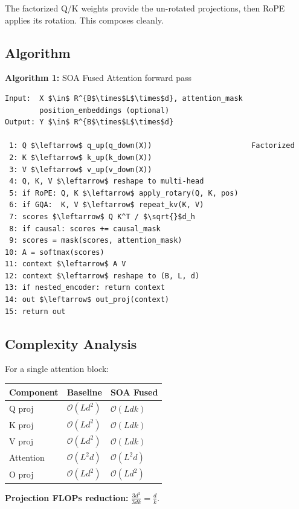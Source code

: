 The factorized Q/K weights provide the un-rotated projections, then RoPE 
applies its rotation. This composes cleanly.

\subsection{Algorithm}

\textbf{Algorithm 1:} SOA Fused Attention forward pass
\begin{lstlisting}
Input:  X $\in$ R^{B$\times$L$\times$d}, attention_mask
        position_embeddings (optional)
Output: Y $\in$ R^{B$\times$L$\times$d}

 1: Q $\leftarrow$ q_up(q_down(X))                       Factorized
 2: K $\leftarrow$ k_up(k_down(X))
 3: V $\leftarrow$ v_up(v_down(X))
 4: Q, K, V $\leftarrow$ reshape to multi-head
 5: if RoPE: Q, K $\leftarrow$ apply_rotary(Q, K, pos)
 6: if GQA:  K, V $\leftarrow$ repeat_kv(K, V)
 7: scores $\leftarrow$ Q K^T / $\sqrt{}$d_h
 8: if causal: scores += causal_mask
 9: scores = mask(scores, attention_mask)
10: A = softmax(scores)
11: context $\leftarrow$ A V
12: context $\leftarrow$ reshape to (B, L, d)
13: if nested_encoder: return context
14: out $\leftarrow$ out_proj(context)
15: return out
\end{lstlisting}

\subsection{Complexity Analysis}

For a single attention block:

\begin{table}[H]
\centering
\small
\begin{tabular}{lll}
\toprule
\textbf{Component} & \textbf{Baseline} & \textbf{SOA Fused} \\
\midrule
Q proj & $\mathcal{O}(L d^2)$ & $\mathcal{O}(L d k)$ \\
K proj & $\mathcal{O}(L d^2)$ & $\mathcal{O}(L d k)$ \\
V proj & $\mathcal{O}(L d^2)$ & $\mathcal{O}(L d k)$ \\
Attention & $\mathcal{O}(L^2 d)$ & $\mathcal{O}(L^2 d)$ \\
O proj & $\mathcal{O}(L d^2)$ & $\mathcal{O}(L d^2)$ \\
\bottomrule
\end{tabular}
\end{table}

\textbf{Projection FLOPs reduction:} $\frac{3 d^2}{3 d k} = \frac{d}{k}$.

